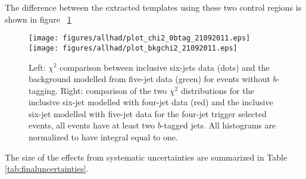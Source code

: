 The difference between the extracted templates using these two control regions is shown in figure ~\ref{fig:chi2.eps}
\begin{figure}[h!]
  \begin{center}
    \texttt{[image: figures/allhad/plot\_chi2\_0btag\_21092011.eps]} 
    \texttt{[image: figures/allhad/plot\_bkgchi2\_21092011.eps]}\\
  \end{center}
  \caption{Left: $\chi^2$ comparison between inclusive six-jets data (dots) and the background modelled from five-jet data (green) for events without $b$-tagging. Right: comparison of the two $\chi^2$ distributions for the inclusive six-jet modelled with four-jet data (red) and the inclusive six-jet modelled with five-jet data for the four-jet trigger selected events, all events have at least two $b$-tagged jets. All histograms are normalized to have integral equal to one.}
  \label{fig:chi2.eps}
\end{figure} 

The size of the effects from systematic uncertainties are summarized in Table \ref{tab:finaluncertainties}.

